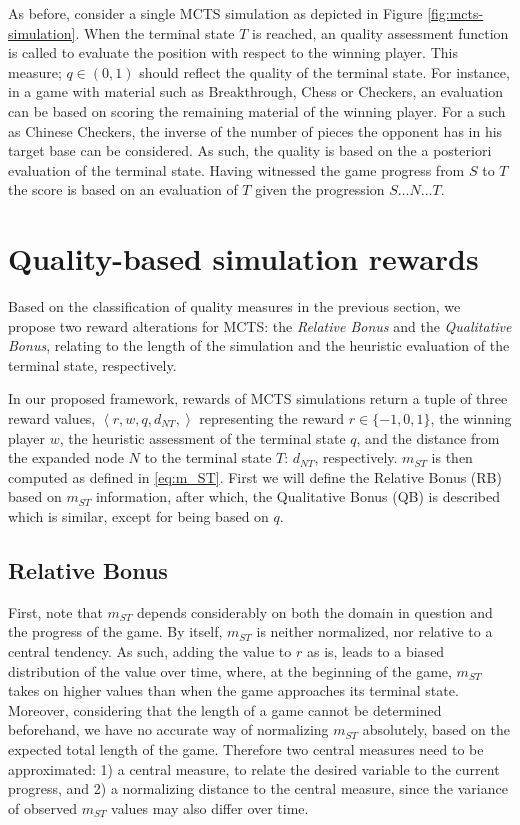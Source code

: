 \documentclass{ecai2010}
\newcommand{\tuple}[1]{\ensuremath{\left \langle #1 \right \rangle }}
\begin{document}
As before, consider a single MCTS simulation as depicted in Figure \ref{fig:mcts-simulation}. When the terminal state $T$ is reached, an quality assessment function is called to evaluate the position with respect to the winning player. This measure; $q \in (0, 1)$ should reflect the quality of the terminal state. For instance, in a game with material such as Breakthrough, Chess or Checkers, an evaluation can be based on scoring the remaining material of the winning player. For a such as Chinese Checkers, the inverse of the number of pieces the opponent has in his target base can be considered. As such, the quality is based on the a posteriori evaluation of the terminal state. Having witnessed the game progress from $S$ to $T$ the score is based on an evaluation of $T$ given the progression $S \ldots N \ldots T$.

\section{Quality-based simulation rewards}
\label{sec:qoreward}
Based on the classification of quality measures in the previous section, we propose two reward alterations for MCTS: the \emph{Relative Bonus} and the \emph{Qualitative Bonus}, relating to the length of the simulation and the heuristic evaluation of the terminal state, respectively. 

In our proposed framework, rewards of MCTS simulations return a tuple of three reward values, $\tuple{r, w, q, d_{NT},}$ representing the reward $r \in \{-1, 0, 1\}$, the winning player $w$, the heuristic assessment of the terminal state $q$, and the distance from the expanded node $N$ to the terminal state $T$: $d_{NT}$, respectively. $m_{ST}$ is then computed as defined in \ref{eq:m_ST}. First we will define the Relative Bonus (RB) based on $m_{ST}$ information, after which, the Qualitative Bonus (QB) is described which is similar, except for being based on $q$.

\subsection{Relative Bonus}
First, note that $m_{ST}$ depends considerably on both the domain in question and the progress of the game. By itself, $m_{ST}$ is neither normalized, nor relative to a central tendency. As such, adding the value to $r$ as is, leads to a biased distribution of the value over time, where, at the beginning of the game, $m_{ST}$ takes on higher values than when the game approaches its terminal state. Moreover, considering that the length of a game cannot be determined beforehand, we have no accurate way of normalizing $m_{ST}$ absolutely, based on the expected total length of the game. Therefore two central measures need to be approximated: 1) a central measure, to relate the desired variable to the current progress, and 2) a normalizing distance to the central measure, since the variance of observed $m_{ST}$ values may also differ over time.
\end{document}
